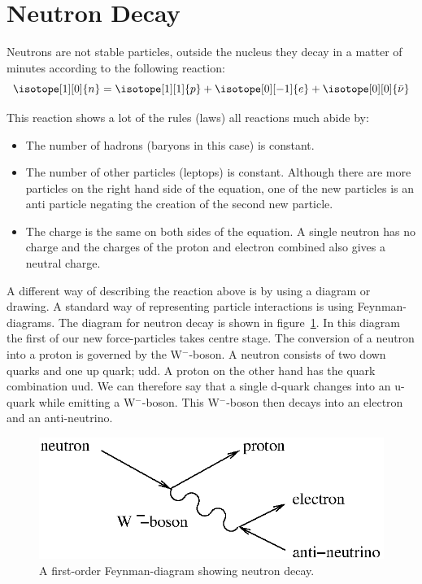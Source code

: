 \documentclass[12pt,a4paper]{article}
\numberwithin{equation}{section}
\numberwithin{figure}{section}
\numberwithin{table}{section}
\begin{document}
\section{Neutron Decay}
Neutrons are not stable particles, outside the nucleus they decay in a matter of minutes according to the following reaction:
\begin{equation}
\isotope[1][0]{n} = \isotope[1][1]{p} + \isotope[0][-1]{e} + \isotope[0][0]{\bar{\nu}} \label{eq:neut_decay}
\end{equation}

This reaction shows a lot of the rules (laws) all reactions much abide by:
\begin{itemize}
\item The number of hadrons (baryons in this case) is constant.
\item The number of other particles (leptops) is constant. Although there are more particles on the right hand side of the equation, one of the new particles is an anti particle negating the creation of the second new particle.
\item The charge is the same on both sides of the equation. A single neutron has no charge and the charges of the proton and electron combined also gives a neutral charge.
\end{itemize}

A different way of describing the reaction above is by using a diagram or drawing. A standard way of representing particle interactions is using Feynman-diagrams. The diagram for neutron decay is shown in figure~\ref{fig:Feyn_Neutron}. In this diagram the first of our new force-particles takes centre stage. The conversion of a neutron into a proton is governed by the W$^-$-boson. A neutron consists of two down quarks and one up quark; udd. A proton on the other hand has the quark combination uud. We can therefore say that a single d-quark changes into an u-quark while emitting a W$^-$-boson. This W$^-$-boson then decays into an electron and an anti-neutrino.

\begin{figure}\begin{center}
\includegraphics[scale=1]{Feyn_Neutron.eps}%
\caption{A first-order Feynman-diagram showing neutron decay.}\label{fig:Feyn_Neutron}
\end{center}\end{figure}
\end{document}
